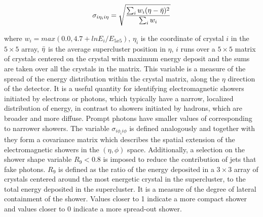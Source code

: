\begin{equation}
    \sigma_{i\eta_{i} i\eta} = \sqrt{\frac{\sum_i w_i (\eta - \Bar{\eta})^2}{\sum_i w_i}}
\end{equation}

where $w_i = max(0.0, 4.7 + ln E_{i}/E_{5x5})$, $\eta_{i}$ is the coordinate of crystal $i$ in the $5 \times 5$ array, $\Bar{\eta}$ is the average supercluster position in $\eta$, $i$ runs over a $5\times 5$ matrix of crystals centered on the crystal with maximum energy deposit and the sums are taken over all the crystals in the matrix. This variable is a measure of the spread of the energy distribution within the crystal matrix, along the $\eta$ direction of the detector. It is a useful quantity for identifying electromagnetic showers initiated by electrons or photons, which typically have a narrow, localized distribution of energy, in contrast to showers initiated by hadrons, which are broader and more diffuse. Prompt photons have smaller values of \sieie corresponding to narrower showers. The variable $\sigma_{i\phi_{i} i\phi}$ is defined analogously and together with \sieie they form a covariance matrix which describes the spatial extension of the electromagnetic showers in the $(\eta, \phi)$ space. Additionally, a selection on the shower shape variable $R_{9} < 0.8$ is imposed to reduce the contribution of jets that fake photons. $R_{9}$ is defined as the ratio of the energy deposited in a $3\times 3$ array of crystals centered around the most energetic crystal in the supercluster, to the total energy deposited in the supercluster. It is a measure of the degree of lateral containment of the shower. Values closer to 1 indicate a more compact shower and values closer to 0 indicate a more spread-out shower. 

